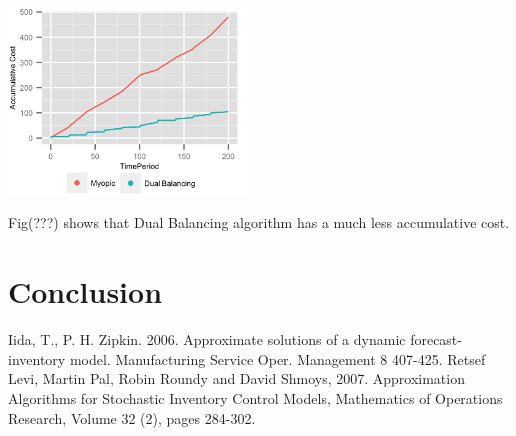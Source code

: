 \documentclass[twoside]{article}
\begin{document}
\begin{multicols}{2}
 \begin{center}
  \includegraphics[width=2.5in]{figures/MyopicBadAccumulativeCostWriteup.png}
  \end{center}
  Fig(???) shows that Dual Balancing algorithm has a much less accumulative cost.

\section{Conclusion}

\lipsum[7] %


\begin{thebibliography}{99} %

Iida, T., P. H. Zipkin. 2006. Approximate solutions of a dynamic forecast-inventory model. Manufacturing Service Oper. Management
8 407-425.
Retsef Levi, Martin Pal, Robin Roundy and David Shmoys, 2007. Approximation Algorithms for Stochastic Inventory Control Models, Mathematics of Operations Research, Volume 32 (2), pages 284-302.

\end{thebibliography}


\end{multicols}
\end{document}
